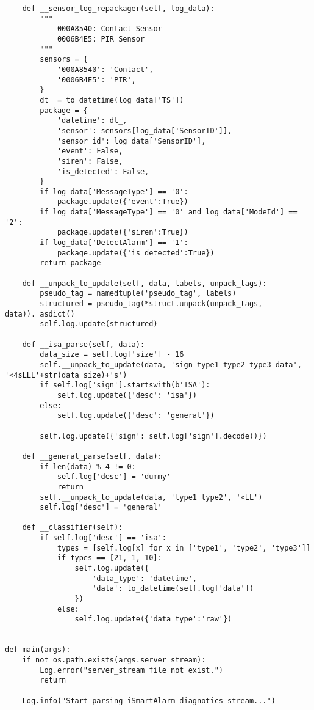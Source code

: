 \documentclass{easychair}
\begin{document}
\begin{enumerate}
\begin{lstlisting}
    def __sensor_log_repackager(self, log_data):
        """
            000A8540: Contact Sensor
            0006B4E5: PIR Sensor
        """
        sensors = {
            '000A8540': 'Contact',
            '0006B4E5': 'PIR',
        }
        dt_ = to_datetime(log_data['TS'])
        package = {
            'datetime': dt_,
            'sensor': sensors[log_data['SensorID']],
            'sensor_id': log_data['SensorID'],
            'event': False,
            'siren': False,
            'is_detected': False,
        }
        if log_data['MessageType'] == '0':
            package.update({'event':True})
        if log_data['MessageType'] == '0' and log_data['ModeId'] == '2':
            package.update({'siren':True})
        if log_data['DetectAlarm'] == '1':
            package.update({'is_detected':True})
        return package

    def __unpack_to_update(self, data, labels, unpack_tags):
        pseudo_tag = namedtuple('pseudo_tag', labels)
        structured = pseudo_tag(*struct.unpack(unpack_tags, data))._asdict()
        self.log.update(structured)

    def __isa_parse(self, data):
        data_size = self.log['size'] - 16
        self.__unpack_to_update(data, 'sign type1 type2 type3 data', '<4sLLL'+str(data_size)+'s')
        if self.log['sign'].startswith(b'ISA'):
            self.log.update({'desc': 'isa'})
        else:
            self.log.update({'desc': 'general'})

        self.log.update({'sign': self.log['sign'].decode()})

    def __general_parse(self, data):
        if len(data) % 4 != 0:
            self.log['desc'] = 'dummy'
            return
        self.__unpack_to_update(data, 'type1 type2', '<LL')
        self.log['desc'] = 'general'

    def __classifier(self):
        if self.log['desc'] == 'isa':
            types = [self.log[x] for x in ['type1', 'type2', 'type3']]
            if types == [21, 1, 10]:
                self.log.update({
                    'data_type': 'datetime',
                    'data': to_datetime(self.log['data'])
                })
            else:
                self.log.update({'data_type':'raw'})


def main(args):
    if not os.path.exists(args.server_stream):
        Log.error("server_stream file not exist.")
        return

    Log.info("Start parsing iSmartAlarm diagnotics stream...")


\end{lstlisting}
\end{enumerate}
\end{document}
